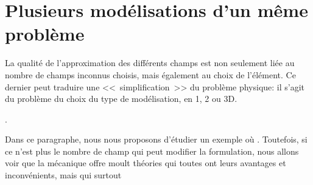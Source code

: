 \medskip
\section{Plusieurs modélisations d'un même problème}\label{Sec-PlusModel}

La qualité de l'approximation des différents champs est non seulement liée
au nombre de champs inconnus choisis, mais également au choix de l'élément.
Ce dernier peut traduire une <<~simplification~>> du problème physique:
il s'agit du problème du choix du type de modélisation, en 1, 2 ou 3D.

.

\medskip
Dans ce paragraphe, nous nous proposons d'étudier un exemple où
.
Toutefois, si ce n'est plus le nombre de champ qui peut modifier la formulation,
nous allons voir que la mécanique offre moult théories qui toutes ont leurs
avantages et inconvénients, mais qui surtout 

